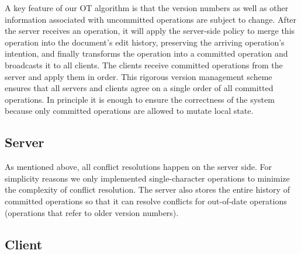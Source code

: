 A key feature of our OT algorithm is that the version numbers as well as other
information associated with uncommitted operations are subject to change. After
the server receives an operation, it will apply the server-side policy to merge
this operation into the document's edit history, preserving the arriving
operation's intention, and finally transforms the operation into a committed
operation and broadcasts it to all clients. The clients receive committed
operations from the server and apply them in order. This rigorous version
management scheme ensures that all servers and clients agree on a single order
of all committed operations. In principle it is enough to ensure the correctness
of the system because only committed operations are allowed to mutate local
state.

\subsection{Server}

As mentioned above, all conflict resolutions happen on the server side. For
simplicity reasons we only implemented single-character operations to minimize
the complexity of conflict resolution. The server also stores the entire history
of committed operations so that it can resolve conflicts for out-of-date
operations (operations that refer to older version numbers).

\subsection{Client}
\label{sec:design_client}